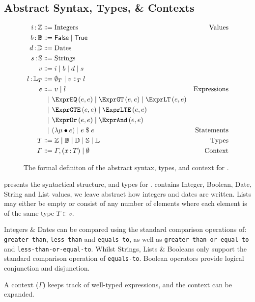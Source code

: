 \subsection{Abstract Syntax, Types, \& Contexts}
\label{subsec:defs}

\begin{figure}[ht]
  \centering
\begin{align*}
  \ty{i}{\mathbb{Z}}
  &
    \Coloneqq
    \text{Integers}
  & \text{Values}
  \\
  \ty{b}{\mathbb{B}}
  & \Coloneqq
    \mathsf{False}\alt\mathsf{True}
  \\
  \ty{d}{\mathbb{D}}
  & \Coloneqq
    \text{Dates}
  \\
  \ty{s}{\mathbb{S}}
  & \Coloneqq
    \text{Strings}
  \\
  v
  &
    \Coloneqq
    i
    \alt
    b
    \alt
    d
    \alt
    s
  \\
  \ty{l}{\mathbb{L}_T}
  & \Coloneqq
    \emptyset_T\alt{}v\Cons_T{}l
  \\
  e
  &
    \Coloneqq
    v
    \alt
    l
  & \text{Expressions}
  \\
  &
    \firstAlt
    \exprEQ{e}{e}
    \alt
    \exprGT{e}{e}
    \alt
    \exprLT{e}{e}
  \\
  & \firstAlt
    \exprGTE{e}{e}
    \alt
    \exprLTE{e}{e}
  &
  \\
  & \firstAlt
    \exprOr{e}{e}
    \alt
    \exprAnd{e}{e}
  &
  \\
  &
    \firstAlt
    \left( \lambda \mu \bullet e \right)
    \alt
    e \; \$ \; e
  &
    \text{Statements}
  \\
  T
  &
    \Coloneqq
    \mathbb{Z}
    \alt
    \mathbb{B}
    \alt
    \mathbb{D}
    \alt
    \mathbb{S}
    \alt
    \mathbb{L}
  &
    \text{Types}
  \\
  \Gamma
  &
    \Coloneqq
    \envAdd{(\ty{x}{T})}
    \alt
    \emptyset
    &
      \text{Context}
\end{align*}
  \caption{\label{fig:syntax}The formal definiton of the abstract syntax, types, and context for \thePolicyLang.}
\end{figure}

 presents the syntactical structure, and types for \thePolicyLang.
\thePolicyLang contains Integer, Boolean, Date, String and List values, we leave abstract how integers and dates are written. Lists may either be empty or consist of any number of elements where each element is of the same type $T \in v$.

Integers \& Dates can be compared using the standard comparison operations of: \texttt{greater-than}, \texttt{less-than} and \texttt{equals-to}, as well as \texttt{greater-than-or-equal-to} and \texttt{less-than-or-equal-to}. Whilst Strings, Lists \& Booleans only support the standard comparison operation of \texttt{equals-to}.
Boolean operators provide logical conjunction and disjunction.

A context ($\Gamma$) keeps track of well-typed expressions, and the \thePolicyLang context can be expanded.
